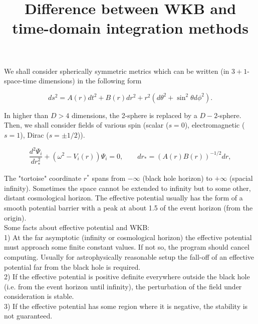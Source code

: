 \documentclass[10pt]{article}
\begin{document}
\title{Difference between WKB and time-domain integration methods}
\date{}
\maketitle



We shall consider spherically symmetric metrics which can be written (in $3+1$- space-time dimensions) in the following form

\begin{equation}\label{MT}
ds^2 = A(r) dt^2 + B(r) d r^2 + r^2 (d \theta^2 + \sin^2 \theta d \phi^2).
\end{equation}

In higher than $D>4$ dimensions, the 2-sphere is replaced by a $D-2$-sphere. Then, we shall consider fields of various spin (scalar ($s=0$), electromagnetic ($s=1$), Dirac ($s=\pm1/2$)).

\begin{equation}\label{wavelike}
\frac{d^{2} \Psi_{i}}{d r_{*}^{2}} + (\omega^{2} - V_{i}(r))\Psi_{i} =
0,\qquad d r_{*}= (A(r) B(r))^{-1/2} dr,
\end{equation}

The "tortoise" coordinate $r^*$ spans from $- \infty$ (black hole horizon) to $+ \infty$ (spacial infinity). Sometimes the space cannot be extended to infinity but to some other, distant cosmological horizon. The effective potential usually has the form of a smooth potential barrier with a peak at about 1.5 of the event horizon (from the origin).\\ 

Some facts about effective potential and WKB:\\

1) At the far asymptotic (infinity or cosmological horizon) the effective potential must approach some finite constant values. If not so, the program should cancel computing. Usually for astrophysically reasonable setup the fall-off of an effective potential far from the black hole is required.\\
    
2) If the effective potential is positive definite everywhere outside the black hole (i.e. from the event horizon until infinity), the perturbation of the field under consideration is stable.\\

3) If the effective potential has some region where it is negative, the stability is not guaranteed. \\
\end{document}
